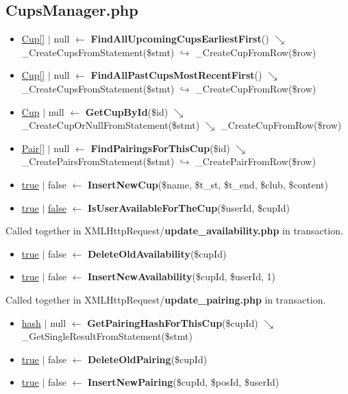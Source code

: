 \subsection{CupsManager.php}
\begin{itemize}
  \setlength\itemsep{0em}
  \item \underline{Cup[]} $\vert$ null $\leftarrow$ \textbf{FindAllUpcomingCupsEarliestFirst}()
  \newline    $\searrow$ \_CreateCupsFromStatement(\$stmt)
  \newline    $\hookrightarrow$ \_CreateCupFromRow(\$row)
  \item \underline{Cup[]} $\vert$ null $\leftarrow$ \textbf{FindAllPastCupsMostRecentFirst}()
  \newline    $\searrow$ \_CreateCupsFromStatement(\$stmt)
  \newline    $\hookrightarrow$ \_CreateCupFromRow(\$row)
  \item \underline{Cup} $\vert$ null  $\leftarrow$  \textbf{GetCupById}(\$id)
  \newline    $\searrow$ \_CreateCupOrNullFromStatement(\$stmt)
  \newline    $\searrow$ \_CreateCupFromRow(\$row)
  \item \underline{Pair[]} $\vert$ null $\leftarrow$  \textbf{FindPairingsForThisCup}(\$id)
  \newline    $\searrow$ \_CreatePairsFromStatement(\$stmt)
  \newline    $\hookrightarrow$ \_CreatePairFromRow(\$row)
  \item \underline{true} $\vert$ false $\leftarrow$  \textbf{InsertNewCup}(\$name, \$t\_st, \$t\_end, \$club, \$content)
  \item \underline{true} $\vert$ \underline{false} $\leftarrow$  \textbf{IsUserAvailableForTheCup}(\$userId, \$cupId)
\end{itemize}
Called together in XMLHttpRequest/\textbf{update\_availability.php} in transaction.  
  \begin{itemize}
  \item \underline{true} $\vert$ false $\leftarrow$ \textbf{DeleteOldAvailability}(\$cupId)
  \item \underline{true} $\vert$ false $\leftarrow$ \textbf{InsertNewAvailability}(\$cupId, \$userId, 1)
\end{itemize}
Called together in XMLHttpRequest/\textbf{update\_pairing.php} in transaction.  
  \begin{itemize}
  \item \underline{hash} $\vert$ null $\leftarrow$ \textbf{GetPairingHashForThisCup}(\$cupId)
  \newline    $\searrow$ \_GetSingleResultFromStatement(\$stmt)
  \item \underline{true} $\vert$ false $\leftarrow$ \textbf{DeleteOldPairing}(\$cupId)
  \item \underline{true} $\vert$ false $\leftarrow$ \textbf{InsertNewPairing}(\$cupId, \$posId, \$userId)
\end{itemize}
